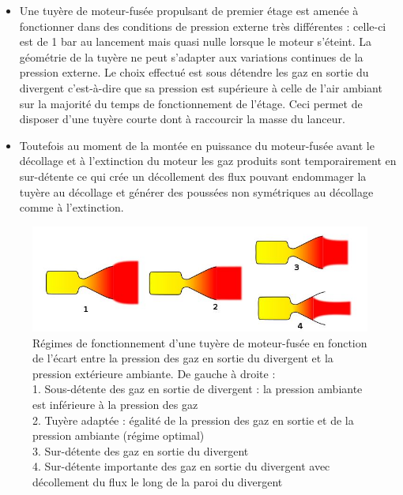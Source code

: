 \documentclass{report}
\begin{document}
\begin{itemize}
    \item Une tuyère de moteur-fusée propulsant de premier étage est amenée à fonctionner dans des conditions de pression externe très différentes : celle-ci est de 1 bar au lancement mais quasi nulle lorsque le moteur s'éteint. La géométrie de la tuyère ne peut s'adapter aux variations continues de la pression externe. Le choix effectué est sous détendre les gaz en sortie du divergent c'est-à-dire que sa pression est supérieure à celle de l'air ambiant sur la majorité du temps de fonctionnement de l'étage. Ceci permet de disposer d'une tuyère courte dont à raccourcir la masse du lanceur.
    \item Toutefois au moment de la montée en puissance du moteur-fusée avant le décollage et à l'extinction du moteur les gaz produits sont temporairement en sur-détente ce qui crée un décollement des flux pouvant endommager la tuyère au décollage et générer des poussées non symétriques au décollage comme à l'extinction.
\end{itemize}

\begin{figure}[h!]
    \centering
    \includegraphics[scale=0.6]{44.JPG}
    \caption{Régimes de fonctionnement d'une tuyère de moteur-fusée en fonction de l'écart entre la pression des gaz en sortie du divergent et la pression extérieure ambiante. De gauche à droite :\\
1. Sous-détente des gaz en sortie de divergent : la pression ambiante est inférieure à la pression des gaz\\
2. Tuyère adaptée : égalité de la pression des gaz en sortie et de la pression ambiante (régime optimal)\\
3. Sur-détente des gaz en sortie du divergent\\
4. Sur-détente importante des gaz en sortie du divergent avec décollement du flux le long de la paroi du divergent}
    \label{44}
\end{figure}
\end{document}
